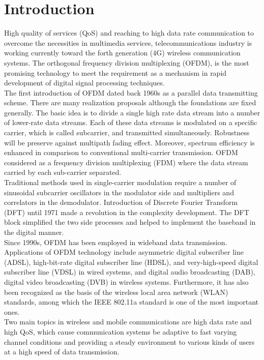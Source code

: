 \chapter{Introduction}
\label{sec:chapter_1}

High quality of services (QoS) and reaching to high data rate communication to overcome the necessities in multimedia services, telecommunications industry is working currently toward the forth generation (4G) wireless communication systems. The orthogonal frequency division multiplexing (OFDM), is the most promising technology to meet the requirement as a mechanism in rapid development of digital signal processing techniques.\\

The first introduction of OFDM dated back 1960s as a parallel data transmitting scheme. There are many realization proposals although the foundations are fixed generally. The basic idea is to divide a single high rate data stream into a number of lower-rate data 
streams. Each of these data streams is modulated on a specific carrier, which is called 
subcarrier, and transmitted simultaneously. Robustness will be preserve against multipath fading effect. Moreover, spectrum efficiency is enhanced in comparison to conventional multi-carrier transmission. OFDM considered as a frequency division multiplexing (FDM) where the data stream carried by each sub-carrier separated.\\

Traditional methods used in single-carrier modulation require a number of sinusoidal subcarrier oscillators in the modulator side and multipliers and correlators in the demodulator. Introduction of Discrete Fourier Transform (DFT) until 1971 made a revolution in the complexity development. The DFT block simplified the two side processes and helped to implement the baseband in the digital manner.\\
Since 1990s, OFDM has been employed in wideband data transmission. Applications of OFDM technology include asymmetric digital subscriber line (ADSL), high-bit-rate digital subscriber line (HDSL), and very-high-speed digital subscriber line (VDSL) in wired systems, and digital audio broadcasting (DAB), digital video broadcasting (DVB) in wireless systems. Furthermore, it has also been recognized as the basis of the wireless local area network (WLAN) standards, among which the IEEE 802.11a standard is one of the most important ones.\\

Two main topics in wireless and mobile communications are high data rate and high QoS, which cause communication systems be adaptive to fast varying channel conditions and providing a steady environment to various kinds of users at a high speed of data transmission.\\

